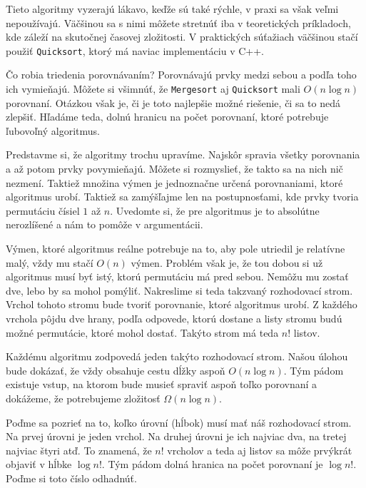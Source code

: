 
Tieto algoritmy vyzerajú lákavo, keďže sú také rýchle, v praxi sa však veľmi nepoužívajú. Väčšinou
sa s nimi môžete stretnúť iba v teoretických príkladoch, kde záleží na skutočnej časovej zložitosti.
V praktických súťažiach väčšinou stačí použiť \texttt{Quicksort}, ktorý má naviac implementáciu v
C++.


Čo robia triedenia porovnávaním? Porovnávajú prvky medzi sebou a podľa toho ich vymieňajú. Môžete si
všimnúť, že \texttt{Mergesort} aj \texttt{Quicksort} mali $O(n\log n)$ porovnaní. Otázkou však je,
či je toto najlepšie možné riešenie, či sa to nedá zlepšiť. Hľadáme teda, dolnú hranicu na počet
porovnaní, ktoré potrebuje ľubovoľný algoritmus.

Predstavme si, že algoritmy trochu upravíme. Najskôr spravia všetky porovnania a až potom prvky
povymieňajú. Môžete si rozmyslieť, že takto sa na nich nič nezmení. Taktiež množina výmen je
jednoznačne určená porovnaniami, ktoré algoritmus urobí. Taktiež sa zamýšľajme len na postupnosťami,
kde prvky tvoria permutáciu čísiel $1$ až $n$. Uvedomte si, že pre algoritmus je to absolútne
nerozlíšené a nám to pomôže v argumentácii.

Výmen, ktoré algoritmus reálne potrebuje na to, aby pole utriedil je relatívne malý, vždy mu stačí
$O(n)$ výmen. Problém však je, že tou dobou si už algoritmus musí byť istý, ktorú permutáciu má pred
sebou. Nemôžu mu zostať dve, lebo by sa mohol pomýliť. Nakreslime si teda takzvaný rozhodovací
strom. Vrchol tohoto stromu bude tvoriť porovnanie, ktoré algoritmus urobí. Z každého vrchola pôjdu
dve hrany, podľa odpovede, ktorú dostane a listy stromu budú možné permutácie, ktoré mohol dostať.
Takýto strom má teda $n!$ listov.

Každému algoritmu zodpovedá jeden takýto rozhodovací strom. Našou úlohou bude dokázať, že vždy
obsahuje cestu dĺžky aspoň $O(n\log n)$. Tým pádom existuje vstup, na ktorom bude musieť spraviť
aspoň toľko porovnaní a dokážeme, že potrebujeme zložitosť $\Omega (n\log n)$.

Poďme sa pozrieť na to, koľko úrovní (hĺbok) musí mať náš rozhodovací strom. Na prvej úrovni je
jeden vrchol. Na druhej úrovni je ich najviac dva, na tretej najviac štyri atď. To znamená, že $n!$
vrcholov a teda aj listov sa môže prvýkrát objaviť v hĺbke $\log n!$. Tým pádom dolná hranica na
počet porovnaní je $\log n!$. Poďme si toto číslo odhadnúť.


